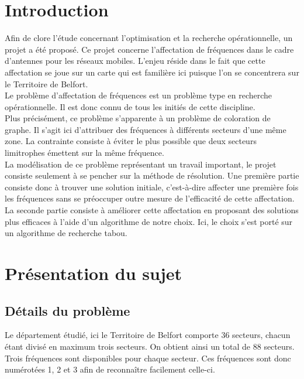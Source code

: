 \documentclass[a4paper, 11pt]{report}
\begin{document}

\chapter*{Introduction}
Afin de clore l'étude concernant l'optimisation et la recherche opérationnelle, un projet a été proposé. Ce projet concerne l'affectation de fréquences dans le cadre d'antennes pour les réseaux mobiles. L'enjeu réside dans le fait que cette affectation se joue sur un carte qui est familière ici puisque l'on se concentrera sur le Territoire de Belfort.\\
Le problème d'affectation de fréquences est un problème type en recherche opérationnelle. Il est donc connu de tous les initiés de cette discipline.\\
Plus précisément, ce problème s'apparente à un problème de coloration de graphe. Il s'agit ici d'attribuer des fréquences à différents secteurs d'une même zone. La contrainte consiste à éviter le plus possible que deux secteurs limitrophes émettent sur la même fréquence.\\
La modélisation de ce problème représentant un travail important, le projet consiste seulement à se pencher sur la méthode de résolution. Une première partie consiste donc à trouver une solution initiale, c'est-à-dire affecter une première fois les fréquences sans se préoccuper outre mesure de l'efficacité de cette affectation. La seconde partie consiste à améliorer cette affectation en proposant des solutions plus efficaces à l'aide d'un algorithme de notre choix. Ici, le choix s'est porté sur un algorithme de recherche tabou.

\chapter{Présentation du sujet}

	\section{Détails du problème}
	Le département étudié, ici le Territoire de Belfort comporte 36 secteurs, chacun étant divisé en maximum trois secteurs. On obtient ainsi un total de 88 secteurs. Trois fréquences sont disponibles pour chaque secteur. Ces fréquences sont donc numérotées 1, 2 et 3 afin de reconna\^itre facilement celle-ci. \\
\end{document}
